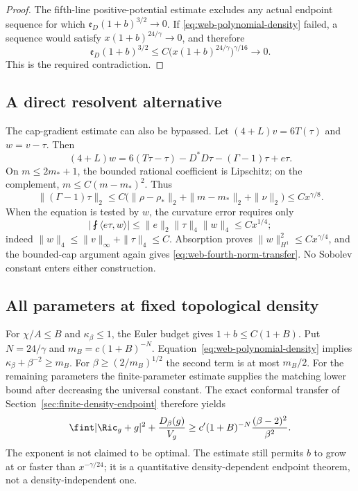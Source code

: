 \begin{proof}
The fifth-line positive-potential estimate excludes any actual
endpoint sequence for which
$\mathfrak e_D(1+b)^{3/2}\to0$. If
\eqref{eq:web-polynomial-density} failed, a sequence would satisfy
$x(1+b)^{24/\gamma}\to0$, and therefore
\[
 \mathfrak e_D(1+b)^{3/2}
 \le C\bigl(x(1+b)^{24/\gamma}\bigr)^{\gamma/16}\longrightarrow0.
\]
This is the required contradiction.
\end{proof}

\subsection{A direct resolvent alternative}
The cap-gradient estimate can also be bypassed. Let
$(4+L)v=6T(\tau)$ and $w=v-\tau$. Then
\[
 (4+L)w=6(T\tau-\tau)-D^*D\tau-(\Gamma-1)\tau+e\tau.
\]
On $m\le2m_*+1$, the bounded rational coefficient is Lipschitz;
on the complement, $m\le C(m-m_*)^2$. Thus
\[
 \|(\Gamma-1)\tau\|_2
 \le C\bigl(\|\rho-\rho_*\|_2+\|m-m_*\|_2+\|\nu\|_2\bigr)
 \le Cx^{\gamma/8}.
\]
When the equation is tested by $w$, the curvature error requires only
\[
 \left|\fint\langle e\tau,w\rangle\right|
 \le\|e\|_2\|\tau\|_4\|w\|_4\le Cx^{1/4};
\]
indeed $\|w\|_4\le\|v\|_\infty+\|\tau\|_4\le C$.
Absorption proves $\|w\|_{H^1}^2\le Cx^{\gamma/4}$, and the
bounded-cap argument again gives \eqref{eq:web-fourth-norm-transfer}.
No Sobolev constant enters either construction.

\subsection{All parameters at fixed topological density}
For $\chi/A\le B$ and $\kappa_\beta\le1$, the Euler budget gives
$1+b\le C(1+B)$. Put $N=24/\gamma$ and $m_B=c(1+B)^{-N}$.
Equation~\eqref{eq:web-polynomial-density} implies
$\kappa_\beta+\beta^{-2}\ge m_B$. For
$\beta\ge(2/m_B)^{1/2}$ the second term is at most $m_B/2$.
For the remaining parameters the finite-parameter estimate supplies
the matching lower bound after decreasing the universal constant.
The exact conformal transfer of Section~\ref{sec:finite-density-endpoint}
therefore yields
\[
 \fint|\Ric_g+g|^2+\frac{D_\beta(g)}{V_g}
 \ge c'(1+B)^{-N}\frac{(\beta-2)^2}{\beta^2}.
\]
The exponent is not claimed to be optimal. The estimate still permits
$b$ to grow at or faster than $x^{-\gamma/24}$; it is a quantitative
density-dependent endpoint theorem, not a density-independent one.
